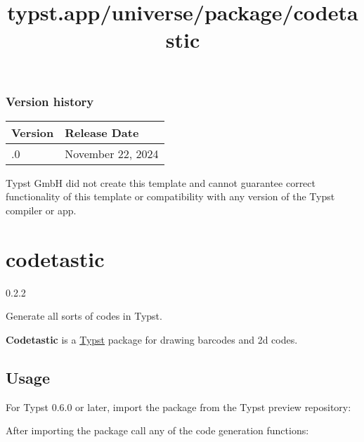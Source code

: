 \label{versions}
\subsubsection{Version history}\label{version-history}

\begin{longtable}[]{@{}ll@{}}
\toprule\noalign{}
Version & Release Date \\
\midrule\noalign{}
\endhead
\bottomrule\noalign{}
\endlastfoot
0.1.0 & November 22, 2024 \\
\end{longtable}

Typst GmbH did not create this template and cannot guarantee correct
functionality of this template or compatibility with any version of the
Typst compiler or app.


\title{typst.app/universe/package/codetastic}

\label{banner}
\section{codetastic}\label{codetastic}

{ 0.2.2 }

Generate all sorts of codes in Typst.

\label{readme}
\textbf{Codetastic} is a \href{https://github.com/typst/typst}{Typst}
package for drawing barcodes and 2d codes.

\subsection{Usage}\label{usage}

For Typst 0.6.0 or later, import the package from the Typst preview
repository:

\begin{Shaded}
\begin{Highlighting}[]
\end{Highlighting}
\end{Shaded}

After importing the package call any of the code generation functions:

\begin{Shaded}
\begin{Highlighting}[]


\end{Highlighting}
\end{Shaded}

